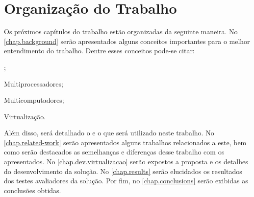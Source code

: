 \section{Organização do Trabalho}
\label{sec.organization}

Os próximos capítulos do trabalho estão organizadas da seguinte maneira. No \autoref{chap.background} serão apresentados alguns conceitos importantes para o melhor entendimento do trabalho. Dentre esses conceitos pode-se citar:
\begin{inlinelist}[label= (\roman*)]
    \item \Lws;
    \item Multiprocessadores;
    \item Multicomputadores;
    \item Virtualização.
\end{inlinelist}
Além disso, será detalhado o \os e o \lw que será utilizado neste trabalho. No \autoref{chap.related-work} serão apresentados alguns trabalhos relacionados a este, bem como serão destacados as semelhanças e diferenças desse trabalho com os apresentados. No \autoref{chap.dev.virtualizacao} serão expostos a proposta e os detalhes do desenvolvimento da solução. No \autoref{chap.results} serão elucidados os resultados dos testes avaliadores da solução. Por fim, no \autoref{chap.conclusions} serão exibidas as conclusões obtidas.
